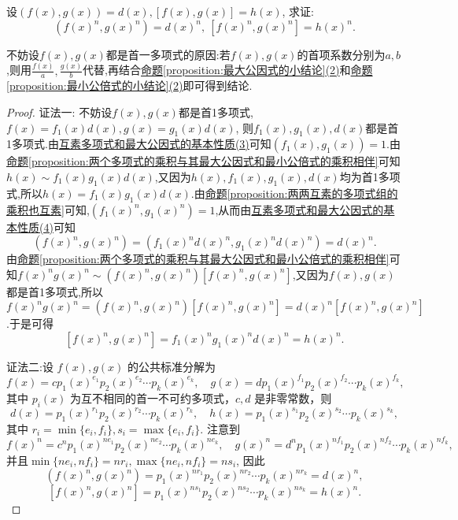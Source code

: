 \documentclass[lang=cn,newtx,10pt,scheme=chinese]{elegantbook}
\begin{document}
\begin{proposition}[最大公因式与最小公倍式在开方下不变]\label{proposition:两个多项式的最大公因式与最小公倍式的n次方就是它们n次方的最大公因式与最小公倍式}
设\((f(x),g(x)) = d(x), [f(x),g(x)] = h(x)\), 求证:
\[
(f(x)^n,g(x)^n)=d(x)^n, \ [f(x)^n,g(x)^n]=h(x)^n.
\]
\end{proposition}
\begin{remark}
不妨设\(f(x),g(x)\)都是首一多项式的原因:若$f(x),g(x)$的首项系数分别为$a,b$,则用$\frac{f(x)}{a},\frac{g(x)}{b}$代替,再结合\hyperref[proposition:最大公因式的小结论]{命题\ref{proposition:最大公因式的小结论}(2)}和\hyperref[proposition:最小公倍式的小结论]{命题\ref{proposition:最小公倍式的小结论}(2)}即可得到结论.
\end{remark}
\begin{proof}
{\color{blue}证法一:}
不妨设\(f(x),g(x)\)都是首1多项式, \(f(x)=f_1(x)d(x), g(x)=g_1(x)d(x)\), 则$f_1(x),g_1(x),d(x)$都是首1多项式.由\hyperref[proposition:互素多项式和最大公因式的基本性质]{互素多项式和最大公因式的基本性质(3)}可知\((f_1(x),g_1(x)) = 1\).由\hyperref[proposition:两个多项式的乘积与其最大公因式和最小公倍式的乘积相伴]{命题\ref{proposition:两个多项式的乘积与其最大公因式和最小公倍式的乘积相伴}}可知\(h(x)\sim f_1(x)g_1(x)d(x)\),又因为$h(x),f_1(x),g_1(x),d(x)$均为首1多项式,所以\(h(x)=f_1(x)g_1(x)d(x)\).由\hyperref[proposition:两两互素的多项式组的乘积也互素]{命题\ref{proposition:两两互素的多项式组的乘积也互素}}可知,\((f_1(x)^n,g_1(x)^n)=1\),从而由\hyperref[proposition:互素多项式和最大公因式的基本性质]{互素多项式和最大公因式的基本性质(4)}可知
\[
(f(x)^n,g(x)^n)=(f_1(x)^nd(x)^n,g_1(x)^nd(x)^n)=d(x)^n.
\]
由\hyperref[proposition:两个多项式的乘积与其最大公因式和最小公倍式的乘积相伴]{命题\ref{proposition:两个多项式的乘积与其最大公因式和最小公倍式的乘积相伴}}可知\(f(x)^ng(x)^n\sim (f(x)^n,g(x)^n)[f(x)^n,g(x)^n]\),又因为$f(x),g(x)$都是首1多项式,所以\(f(x)^ng(x)^n=(f(x)^n,g(x)^n)[f(x)^n,g(x)^n]=d(x)^n[f(x)^n,g(x)^n]\).于是可得
\[
[f(x)^n,g(x)^n]=f_1(x)^ng_1(x)^nd(x)^n=h(x)^n.
\]

{\color{blue}证法二:}设 \(f(x), g(x)\) 的公共标准分解为
\[
f(x) = cp_1(x)^{e_1}p_2(x)^{e_2} \cdots p_k(x)^{e_k}, \quad g(x) = dp_1(x)^{f_1}p_2(x)^{f_2} \cdots p_k(x)^{f_k},
\]
其中 \(p_i(x)\) 为互不相同的首一不可约多项式，\(c, d\) 是非零常数，则
\[
d(x) = p_1(x)^{r_1}p_2(x)^{r_2} \cdots p_k(x)^{r_k}, \quad h(x) = p_1(x)^{s_1}p_2(x)^{s_2} \cdots p_k(x)^{s_k},
\]
其中 \(r_i = \min\{e_i, f_i\}, s_i = \max\{e_i, f_i\}\). 注意到
\[
f(x)^n = c^n p_1(x)^{ne_1}p_2(x)^{ne_2} \cdots p_k(x)^{ne_k}, \quad g(x)^n = d^n p_1(x)^{nf_1}p_2(x)^{nf_2} \cdots p_k(x)^{nf_k},
\]
并且\(\min\{ne_i, nf_i\} = nr_i, \max\{ne_i, nf_i\} = ns_i\), 因此
\[
(f(x)^n, g(x)^n) = p_1(x)^{nr_1}p_2(x)^{nr_2} \cdots p_k(x)^{nr_k} = d(x)^n,
\]
\[
[f(x)^n, g(x)^n] = p_1(x)^{ns_1}p_2(x)^{ns_2} \cdots p_k(x)^{ns_k} = h(x)^n.
\]
\end{proof}
\end{document}
